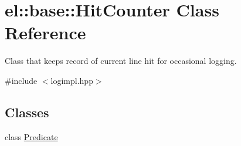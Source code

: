\hypertarget{classel_1_1base_1_1HitCounter}{\section{el\-:\-:base\-:\-:Hit\-Counter Class Reference}
\label{classel_1_1base_1_1HitCounter}
}


Class that keeps record of current line hit for occasional logging.  




{\ttfamily \#include $<$logimpl.\-hpp$>$}

\subsection*{Classes}
\begin{DoxyCompactItemize}
\item 
class \hyperlink{classel_1_1base_1_1HitCounter_1_1Predicate}{Predicate}
\end{DoxyCompactItemize}
